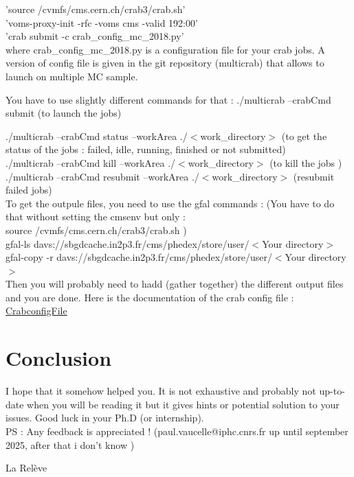 \documentclass[reprint, a4paper, nofootinbib, amsmath, amssymb, aps]{revtex4-1}
\begin{document}
'source /cvmfs/cms.cern.ch/crab3/crab.sh' \\
'voms-proxy-init -rfc -voms cms -valid 192:00'\\
'crab submit -c crab\_config\_mc\_2018.py' \\

where crab\_config\_mc\_2018.py is a configuration file for your crab jobs. A version of config file is given in the git repository (multicrab) that allows to launch on multiple  MC sample.

You have to use slightly different commands for that :
./multicrab --crabCmd submit (to launch the jobs)

./multicrab --crabCmd status --workArea ./$<$work\_directory$>$ (to get the status of the jobs : failed, idle, running, finished or not submitted)\\
./multicrab --crabCmd kill --workArea ./$<$work\_directory$>$ (to kill the jobs )\\
./multicrab --crabCmd resubmit --workArea ./$<$work\_directory$>$ (resubmit failed jobs)\\

To get the outpule files, you need to use the gfal commands :
(You have to do that without setting the cmsenv but only :\\
source /cvmfs/cms.cern.ch/crab3/crab.sh )\\
gfal-ls davs://sbgdcache.in2p3.fr/cms/phedex/store/user/$<$Your directory$>$\\
gfal-copy -r davs://sbgdcache.in2p3.fr/cms/phedex/store/user/$<$Your directory$>$ \\
Then you will probably need to hadd (gather together) the different output files and you are done.
Here is the documentation of the crab config file : \\
\href{https://twiki.cern.ch/twiki/bin/view/CMSPublic/CRAB3ConfigurationFile}{CrabconfigFile}

\section{Conclusion}

I hope that it somehow helped you. It is not exhaustive and probably not up-to-date when you will be reading it but it gives hints or potential solution to your issues. Good luck in your Ph.D (or internship).\\
PS : Any feedback is appreciated ! (paul.vaucelle@iphc.cnrs.fr up until september 2025, after that i don't know )

La Relève 
\end{document}
